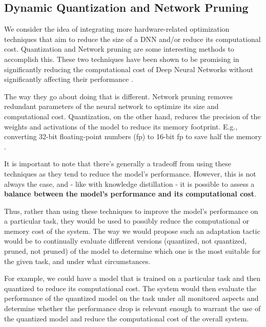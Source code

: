 \documentclass[../main.tex]{subfiles}
\begin{document}
    \subsection{Dynamic Quantization and Network Pruning} \label{sec:dynamic_quantization_pruning_sparsification} 

    We consider the idea of integrating more hardware-related optimization techniques that aim to reduce the size of a DNN and/or reduce its computational cost. Quantization and Network pruning are some interesting methods to accomplish this. These two techniques have been shown to be promising in significantly reducing the computational cost of Deep Neural Networks without significantly affecting their performance \cite{carreira-perpinan_model_2017, han_deep_2016, carreira-perpinan_compression_2018}.
    
    The way they go about doing that is different. Network pruning removes redundant parameters of the neural network to optimize its size and computational cost. Quantization, on the other hand, reduces the precision of the weights and activations of the model to reduce its memory footprint. E.g., converting 32-bit floating-point numbers (fp) to 16-bit fp to save half the memory \cite{han_deep_2016, carreira-perpinan_compression_2018}.

    It is important to note that there's generally a tradeoff from using these techniques as they tend to reduce the model's performance. However, this is not always the case, and - like with knowledge distillation - it is possible to assess a \textbf{balance between the model's performance and its computational cost}.
    
    Thus, rather than using these techniques to improve the model's performance on a particular task, they would be used to possibly reduce the computational or memory cost of the system. The way we would propose such an adaptation tactic would be to continually evaluate different versions (quantized, not quantized, pruned, not pruned) of the model to determine which one is the most suitable for the given task, and under what circumstances.

    For example, we could have a model that is trained on a particular task and then quantized to reduce its computational cost. The system would then evaluate the performance of the quantized model on the task under all monitored aspects and determine whether the performance drop is relevant enough to warrant the use of the quantized model and reduce the computational cost of the overall system.
\end{document}
